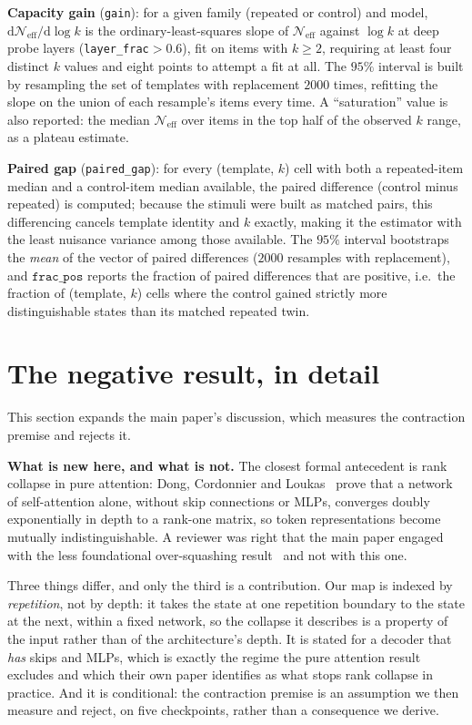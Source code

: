 \documentclass[11pt]{article}
\begin{document}
\textbf{Capacity gain} (\texttt{gain}): for a given family (repeated or
control) and model, $\mathrm{d}\mathcal{N}_{\mathrm{eff}}/\mathrm{d}\log k$ is
the ordinary-least-squares slope of $\mathcal{N}_{\mathrm{eff}}$ against
$\log k$ at deep probe layers (\texttt{layer\_frac}$>0.6$), fit on items with
$k\ge2$, requiring at least four distinct $k$ values and eight points to
attempt a fit at all. The $95\%$ interval is built by resampling the set of
templates with replacement $2000$ times, refitting the slope on the union of
each resample's items every time. A ``saturation'' value is also reported: the
median $\mathcal{N}_{\mathrm{eff}}$ over items in the top half of the
observed $k$ range, as a plateau estimate.

\textbf{Paired gap} (\texttt{paired\_gap}): for every (template, $k$) cell
with both a repeated-item median and a control-item median available, the
paired difference (control minus repeated) is computed; because the stimuli
were built as matched pairs, this differencing cancels template identity and
$k$ exactly, making it the estimator with the least nuisance variance among
those available. The $95\%$ interval bootstraps the \emph{mean} of the vector
of paired differences ($2000$ resamples with replacement), and
$\texttt{frac\_pos}$ reports the fraction of paired differences that are
positive, i.e.\ the fraction of (template, $k$) cells where the control
gained strictly more distinguishable states than its matched repeated twin.

\section{The negative result, in detail}
\label{sec:s5}

This section expands the main paper's discussion, which measures the
contraction premise and rejects it.

\textbf{What is new here, and what is not.} The closest formal antecedent is
rank collapse in pure attention: Dong, Cordonnier and
Loukas~\cite{dong2021attention} prove that a network of self-attention alone,
without skip connections or MLPs, converges doubly exponentially in depth to a
rank-one matrix, so token representations become mutually indistinguishable. A
reviewer was right that the main paper engaged with the less foundational
over-squashing result~\cite{barbero2024glasses} and not with this one.

Three things differ, and only the third is a contribution. Our map is indexed by
\emph{repetition}, not by depth: it takes the state at one repetition boundary to
the state at the next, within a fixed network, so the collapse it describes is a
property of the input rather than of the architecture's depth. It is stated for
a decoder that \emph{has} skips and MLPs, which is exactly the regime the pure
attention result excludes and which their own paper identifies as what stops
rank collapse in practice. And it is conditional: the contraction premise is an
assumption we then measure and reject, on five checkpoints, rather than a
consequence we derive.
\end{document}

